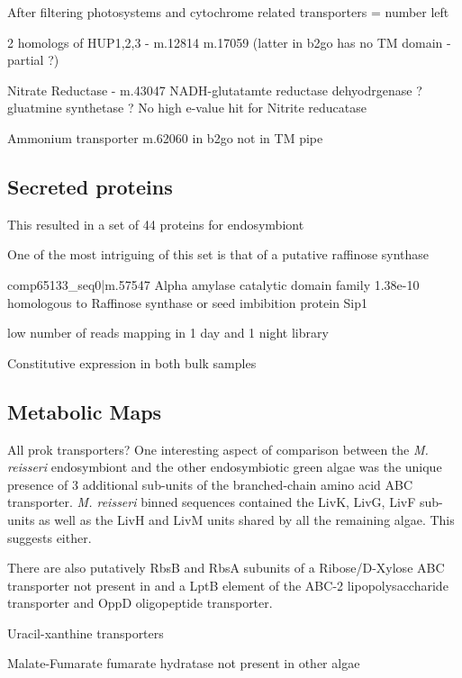 After filtering photosystems and cytochrome related transporters = number left


2 homologs of HUP1,2,3 - m.12814 m.17059 (latter in b2go has no TM domain - partial ?)


Nitrate Reductase - m.43047  
NADH-glutatamte reductase dehyodrgenase ?
gluatmine synthetase ?
No high e-value hit for Nitrite reducatase

Ammonium transporter m.62060 in b2go not in TM pipe






\subsection{Secreted proteins}

This resulted in a set of 44 proteins for endosymbiont 




One of the most intriguing of this set is that
of a putative raffinose synthase


comp65133\_seq0|m.57547 Alpha amylase catalytic domain family
1.38e-10
homologous to Raffinose synthase or seed imbibition protein Sip1


low number of reads mapping in 1 day and 1 night library

Constitutive expression in both bulk samples 

\subsection{Metabolic Maps}



All prok transporters?
One interesting aspect of comparison between the \textit{M. reisseri}
endosymbiont and the other endosymbiotic green algae was the unique presence of 3
additional sub-units of the branched-chain amino acid ABC transporter.
\textit{M. reisseri} binned sequences contained the LivK, LivG, LivF sub-units
as well as the LivH and LivM units shared by all the remaining algae. 
This suggests either. 

There are also putatively RbsB and RbsA subunits of a Ribose/D-Xylose
ABC transporter not present in 
and a LptB element of the ABC-2 lipopolysaccharide transporter
and OppD oligopeptide transporter.


Uracil-xanthine transporters




Malate-Fumarate fumarate hydratase not present in other algae





